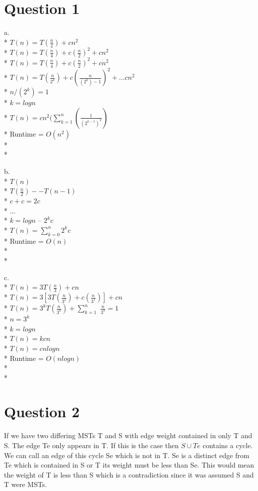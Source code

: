 \documentclass[11pt]{book}
\begin{document}
\maketitle


\section*{Question 1}
a.\\*
$T(n) = T(\frac{n}{2}) + cn^2$\\*
$T(n) = T(\frac{n}{4}) + c(\frac{n}{2})^2 + cn^2$\\*
$T(n) = T(\frac{n}{4}) + c(\frac{n}{2})^2 + cn^2$\\*
$T(n) = T(\frac{n}{2^k}) + c(\frac{n}{(2^k)-1})^2 + ... cn^2$\\*
$n/(2^k) = 1$\\*
$k = logn$\\*
$T(n) = cn^2(\sum_{k=1}^{n} (\frac{1}{(2^{k-1})^2})$\\*
Runtime = $O(n^2)$\\*\\*

b.\\*
$T(n)$\\*
$T(\frac{n}{2})--T(n-1)$\\*
$c+c = 2c$\\*
$...$\\*
$k = logn$ -- $2^kc$\\*
$T(n) = \sum_{k=0}^{n} 2^kc$\\*
Runtime = $O(n)$\\*\\*

c.\\*
$T(n) = 3T(\frac{n}{3}) + cn$\\*
$T(n) = 3[3T(\frac{n}{3^2}) + c(\frac{n}{3^1})] + cn$\\*
$T(n) = 3^kT(\frac{n}{3^k}) + \sum_{k=1}^{n}$
$\frac{n}{3^k} = 1$\\*
$n = 3^k$\\*
$k = logn$\\*
$T(n) = kcn$\\*
$T(n) = cnlogn$\\*
Runtime = $O(nlogn)$\\*\\*

\section*{Question 2}
If we have two differing MSTs T and S with edge
weight contained in only T and S. The edge Te only appears in T. 
If this is the case then $S\cup{Te}$ contains a cycle. We can call 
an edge of this cycle Se which is not in T. Se is a distinct edge from 
Te which is contained in S or T its weight must be less than Se. This 
would mean the weight of T is less than S which is a contradiction 
since it was assumed S and T were MSTs.
\end{document}
